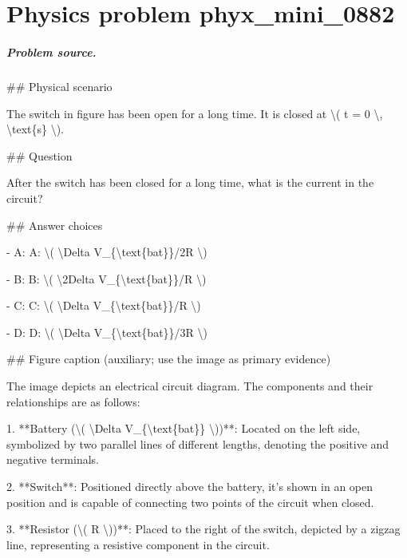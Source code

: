 
\chapter{Physics problem phyx\_mini\_0882}
\label{ch:PhyXMiniProblems_problem_phyx_mini_0882}

\paragraph{Problem source.}
\#\# Physical scenario

The switch in figure has been open for a long time. It is closed at \textbackslash{}( t = 0 \textbackslash{}, \textbackslash{}text\{s\} \textbackslash{}).

\#\# Question

After the switch has been closed for a long time, what is the current in the circuit?

\#\# Answer choices

- A: A: \textbackslash{}( \textbackslash{}Delta V\_\{\textbackslash{}text\{bat\}\}/2R \textbackslash{})

- B: B: \textbackslash{}( \textbackslash{}2Delta V\_\{\textbackslash{}text\{bat\}\}/R \textbackslash{})

- C: C: \textbackslash{}( \textbackslash{}Delta V\_\{\textbackslash{}text\{bat\}\}/R \textbackslash{})

- D: D: \textbackslash{}( \textbackslash{}Delta V\_\{\textbackslash{}text\{bat\}\}/3R \textbackslash{})

\#\# Figure caption (auxiliary; use the image as primary evidence)

The image depicts an electrical circuit diagram. The components and their relationships are as follows:

1. **Battery (\textbackslash{}( \textbackslash{}Delta V\_\{\textbackslash{}text\{bat\}\} \textbackslash{}))**: Located on the left side, symbolized by two parallel lines of different lengths, denoting the positive and negative terminals.

2. **Switch**: Positioned directly above the battery, it's shown in an open position and is capable of connecting two points of the circuit when closed.

3. **Resistor (\textbackslash{}( R \textbackslash{}))**: Placed to the right of the switch, depicted by a zigzag line, representing a resistive component in the circuit.

